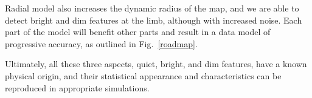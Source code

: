 \documentclass{aa}
\begin{document}
Radial model also increases the dynamic radius of the map, and we are able to detect bright and dim features at the 
limb, although with increased noise. Each part of the model will benefit other parts and result in a data model of progressive accuracy, as outlined in Fig.~\ref{roadmap}.

Ultimately, all these three aspects, quiet, bright, and dim features, have a known physical origin, and their 
statistical appearance and characteristics can be reproduced in appropriate simulations.

\end{document}
